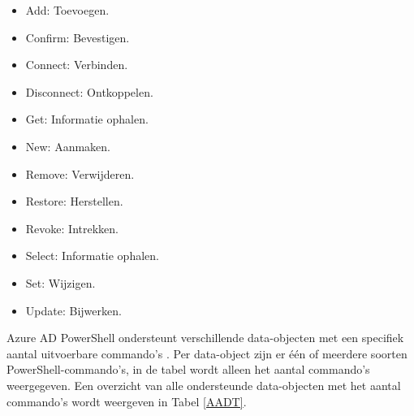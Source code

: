 \begin{itemize}
    \item Add: Toevoegen.
    \item Confirm: Bevestigen.
    \item Connect: Verbinden.
    \item Disconnect: Ontkoppelen.
    \item Get: Informatie ophalen.
    \item New: Aanmaken.
    \item Remove: Verwijderen.
    \item Restore: Herstellen.
    \item Revoke: Intrekken.
    \item Select: Informatie ophalen.
    \item Set: Wijzigen.
    \item Update: Bijwerken.
\end{itemize}

Azure AD PowerShell ondersteunt verschillende data-objecten met een specifiek aantal uitvoerbare commando's \autocite{Microsoft2023i}. Per data-object zijn er één of meerdere soorten PowerShell-commando's, in de tabel wordt alleen het aantal commando's weergegeven. Een overzicht van alle ondersteunde data-objecten met het aantal commando's wordt weergeven in Tabel \ref{AADT}. 


